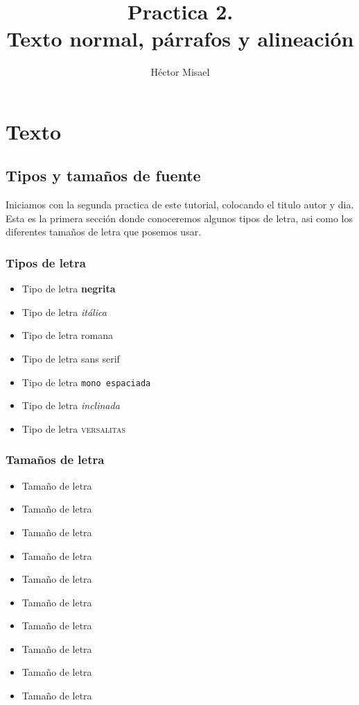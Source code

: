 \documentclass[12pt]{book}
\begin{document}
\title{Practica 2.\\ Texto normal, párrafos y alineación }
\author{Héctor Misael}
\date{}
\maketitle
\tableofcontents
\chapter{Texto}
\section{Tipos y tamaños de fuente}
Iniciamos con la segunda practica de este tutorial, colocando el titulo autor y dia. Esta es la primera sección donde conoceremos algunos tipos de letra, asi como los diferentes tamaños de letra que posemos usar.
\subsection{Tipos de letra}
\begin{itemize}
\item Tipo de letra \textbf{negrita}
\item Tipo de letra \textit{itálica}
\item Tipo de letra \textrm{romana}
\item Tipo de letra \textsf{sans serif}
\item Tipo de letra \texttt{mono espaciada}
\item Tipo de letra \textsl{inclinada}
\item Tipo de letra \textsc{versalitas}
\end{itemize}

\newpage

\subsection{Tamaños de letra}
\begin{itemize}
\item {\tiny Tamaño} de letra
\item {\scriptsize Tamaño} de letra
\item {\footnotesize Tamaño} de letra
\item {\small Tamaño} de letra
\item {\normalsize Tamaño} de letra
\item {\large Tamaño} de letra
\item {\Large Tamaño} de letra
\item {\LARGE Tamaño} de letra
\item {\huge Tamaño} de letra
\item {\Huge Tamaño} de letra
\end{itemize}
\end{document}
